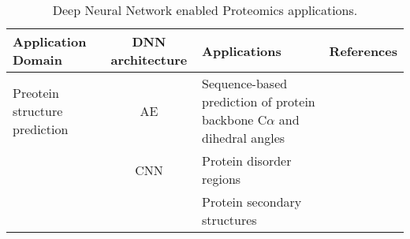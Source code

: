 \begin{table}[h!]
\centering
\begin{tabular}{|| l | c | l | l ||}
    \hline
    Application Domain & DNN architecture & Applications & References\\
    \hline \hline
    Preotein structure prediction & AE & Sequence-based prediction of protein backbone C$\alpha$ and dihedral angles & \\
    & CNN & Protein disorder regions & \\
    &     & Protein secondary structures & \\
    \hline
\end{tabular}
\caption{Deep Neural Network enabled Proteomics applications.}
\label{tab:PS-DNN}
\end{table}